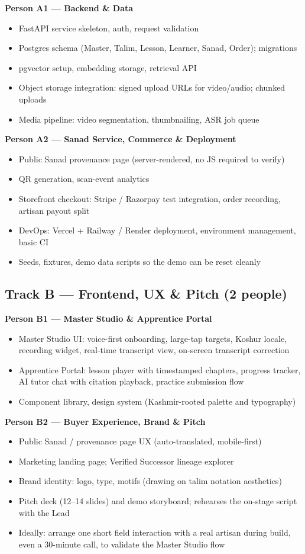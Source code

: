 \documentclass[11pt, a4paper]{article}
\begin{document}
\textbf{Person A1 — Backend \& Data}
\begin{itemize}
  \item FastAPI service skeleton, auth, request validation
  \item Postgres schema (Master, Talim, Lesson, Learner, Sanad, Order); migrations
  \item pgvector setup, embedding storage, retrieval API
  \item Object storage integration: signed upload URLs for video/audio; chunked uploads
  \item Media pipeline: video segmentation, thumbnailing, ASR job queue
\end{itemize}

\textbf{Person A2 — Sanad Service, Commerce \& Deployment}
\begin{itemize}
  \item Public Sanad provenance page (server-rendered, no JS required to verify)
  \item QR generation, scan-event analytics
  \item Storefront checkout: Stripe / Razorpay test integration, order recording, artisan payout split
  \item DevOps: Vercel + Railway / Render deployment, environment management, basic CI
  \item Seeds, fixtures, demo data scripts so the demo can be reset cleanly
\end{itemize}

\subsection{Track B — Frontend, UX \& Pitch (2 people)}

\textbf{Person B1 — Master Studio \& Apprentice Portal}
\begin{itemize}
  \item Master Studio UI: voice-first onboarding, large-tap targets, Koshur locale, recording widget, real-time transcript view, on-screen transcript correction
  \item Apprentice Portal: lesson player with timestamped chapters, progress tracker, AI tutor chat with citation playback, practice submission flow
  \item Component library, design system (Kashmir-rooted palette and typography)
\end{itemize}

\textbf{Person B2 — Buyer Experience, Brand \& Pitch}
\begin{itemize}
  \item Public Sanad / provenance page UX (auto-translated, mobile-first)
  \item Marketing landing page; Verified Successor lineage explorer
  \item Brand identity: logo, type, motifs (drawing on talim notation aesthetics)
  \item Pitch deck (12--14 slides) and demo storyboard; rehearses the on-stage script with the Lead
  \item Ideally: arrange one short field interaction with a real artisan during build, even a 30-minute call, to validate the Master Studio flow
\end{itemize}
\end{document}

